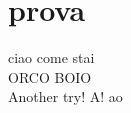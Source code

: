 \documentclass{article}
\begin{document}
    \section{prova}
        ciao come stai\\
        ORCO BOIO\\
        Another try! A! ao
\end{document}
